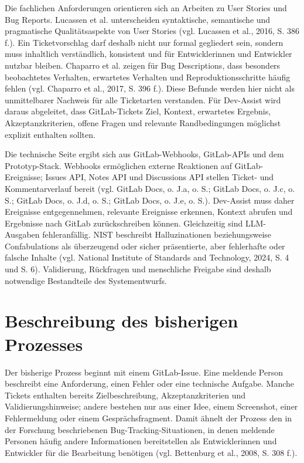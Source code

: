 \documentclass[12pt,a4paper,oneside]{scrreprt}
\begin{document}
Die fachlichen Anforderungen orientieren sich an Arbeiten zu User Stories und Bug Reports. Lucassen et al. unterscheiden syntaktische, semantische und pragmatische Qualitätsaspekte von User Stories (vgl. Lucassen et al., 2016, S. 386 f.). Ein Ticketvorschlag darf deshalb nicht nur formal gegliedert sein, sondern muss inhaltlich verständlich, konsistent und für Entwicklerinnen und Entwickler nutzbar bleiben. Chaparro et al. zeigen für Bug Descriptions, dass besonders beobachtetes Verhalten, erwartetes Verhalten und Reproduktionsschritte häufig fehlen (vgl. Chaparro et al., 2017, S. 396 f.). Diese Befunde werden hier nicht als unmittelbarer Nachweis für alle Ticketarten verstanden. Für Dev-Assist wird daraus abgeleitet, dass GitLab-Tickets Ziel, Kontext, erwartetes Ergebnis, Akzeptanzkriterien, offene Fragen und relevante Randbedingungen möglichst explizit enthalten sollten.

Die technische Seite ergibt sich aus GitLab-Webhooks, GitLab-APIs und dem Prototyp-Stack. Webhooks ermöglichen externe Reaktionen auf GitLab-Ereignisse; Issues API, Notes API und Discussions API stellen Ticket- und Kommentarverlauf bereit (vgl. GitLab Docs, o. J.a, o. S.; GitLab Docs, o. J.c, o. S.; GitLab Docs, o. J.d, o. S.; GitLab Docs, o. J.e, o. S.). Dev-Assist muss daher Ereignisse entgegennehmen, relevante Ereignisse erkennen, Kontext abrufen und Ergebnisse nach GitLab zurückschreiben können. Gleichzeitig sind LLM-Ausgaben fehleranfällig. NIST beschreibt Halluzinationen beziehungsweise Confabulations als überzeugend oder sicher präsentierte, aber fehlerhafte oder falsche Inhalte (vgl. National Institute of Standards and Technology, 2024, S. 4 und S. 6). Validierung, Rückfragen und menschliche Freigabe sind deshalb notwendige Bestandteile des Systementwurfs.

\section{Beschreibung des bisherigen Prozesses}

Der bisherige Prozess beginnt mit einem GitLab-Issue. Eine meldende Person beschreibt eine Anforderung, einen Fehler oder eine technische Aufgabe. Manche Tickets enthalten bereits Zielbeschreibung, Akzeptanzkriterien und Validierungshinweise; andere bestehen nur aus einer Idee, einem Screenshot, einer Fehlermeldung oder einem Gesprächsfragment. Damit ähnelt der Prozess den in der Forschung beschriebenen Bug-Tracking-Situationen, in denen meldende Personen häufig andere Informationen bereitstellen als Entwicklerinnen und Entwickler für die Bearbeitung benötigen (vgl. Bettenburg et al., 2008, S. 308 f.).
\end{document}
